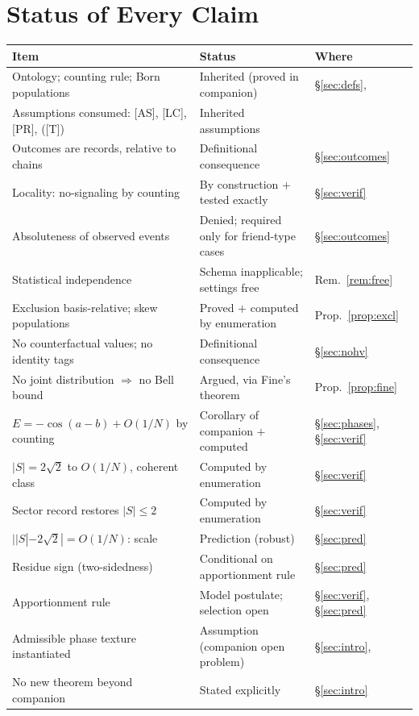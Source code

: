 \documentclass[11pt]{article}
\theoremstyle{definition}
\theoremstyle{remark}
\begin{document}
\section{Status of Every Claim}\label{sec:ledger}
\begin{center}
\begin{tabular}{@{}lll@{}}
\toprule
Item & Status & Where\\
\midrule
Ontology; counting rule; Born populations & Inherited (proved in companion) & \S\ref{sec:defs}, \cite{TillittBorn}\\
Assumptions consumed: [AS], [LC], [PR], ([T]) & Inherited assumptions & \cite{TillittBorn}\\
Outcomes are records, relative to chains & Definitional consequence & \S\ref{sec:outcomes}\\
Locality: no-signaling by counting & By construction $+$ tested exactly & \S\ref{sec:verif}\\
Absoluteness of observed events & Denied; required only for friend-type cases & \S\ref{sec:outcomes}\\
Statistical independence & Schema inapplicable; settings free & Rem.~\ref{rem:free}\\
Exclusion basis-relative; skew populations & Proved $+$ computed by enumeration & Prop.~\ref{prop:excl}\\
No counterfactual values; no identity tags & Definitional consequence & \S\ref{sec:nohv}\\
No joint distribution $\Rightarrow$ no Bell bound & Argued, via Fine's theorem & Prop.~\ref{prop:fine}\\
$E = -\cos(a-b) + O(1/N)$ by counting & Corollary of companion $+$ computed & \S\ref{sec:phases}, \S\ref{sec:verif}\\
$|S| = 2\sqrt{2}$ to $O(1/N)$, coherent class & Computed by enumeration & \S\ref{sec:verif}\\
Sector record restores $|S| \le 2$ & Computed by enumeration & \S\ref{sec:verif}\\
$||S| - 2\sqrt{2}| = O(1/N)$: scale & Prediction (robust) & \S\ref{sec:pred}\\
Residue sign (two-sidedness) & Conditional on apportionment rule & \S\ref{sec:pred}\\
Apportionment rule & Model postulate; selection open & \S\ref{sec:verif}, \S\ref{sec:pred}\\
Admissible phase texture instantiated & Assumption (companion open problem) & \S\ref{sec:intro}, \cite{TillittBorn}\\
No new theorem beyond companion & Stated explicitly & \S\ref{sec:intro}\\
\bottomrule
\end{tabular}
\end{center}
\end{document}
